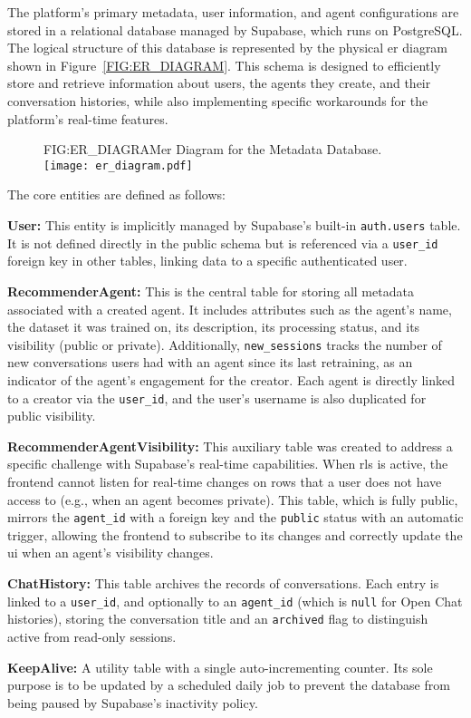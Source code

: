 The platform's primary metadata, user information, and agent configurations are stored in a relational database managed by Supabase, which runs on PostgreSQL. The logical structure of this database is represented by the physical \ac{er} diagram shown in Figure~\ref{FIG:ER_DIAGRAM}. This schema is designed to efficiently store and retrieve information about users, the agents they create, and their conversation histories, while also implementing specific workarounds for the platform's real-time features.

\begin{figure}[Entity-Relationship Diagram]{FIG:ER_DIAGRAM}{\ac{er} Diagram for the Metadata Database.}
    \texttt{[image: er\_diagram.pdf]}
\end{figure}

The core entities are defined as follows:
\begin{compactitem}[\textbullet]
    \item \textbf{User:} This entity is implicitly managed by Supabase's built-in \texttt{auth.users} table. It is not defined directly in the public schema but is referenced via a \texttt{user\_id} foreign key in other tables, linking data to a specific authenticated user.
    \item \textbf{RecommenderAgent:} This is the central table for storing all metadata associated with a created agent. It includes attributes such as the agent's name, the dataset it was trained on, its description, its processing status, and its visibility (public or private). Additionally, \texttt{new\_sessions} tracks the number of new conversations users had with an agent since its last retraining, as an indicator of the agent's engagement for the creator. Each agent is directly linked to a creator via the \texttt{user\_id}, and the user's username is also duplicated for public visibility.
    \item \textbf{RecommenderAgentVisibility:} This auxiliary table was created to address a specific challenge with Supabase's real-time capabilities. When \acl{rls} is active, the frontend cannot listen for real-time changes on rows that a user does not have access to (e.g., when an agent becomes private). This table, which is fully public, mirrors the \texttt{agent\_id} with a foreign key and the \texttt{public} status with an automatic trigger, allowing the frontend to subscribe to its changes and correctly update the \acs{ui} when an agent's visibility changes.
    \item \textbf{ChatHistory:} This table archives the records of conversations. Each entry is linked to a \texttt{user\_id}, and optionally to an \texttt{agent\_id} (which is \texttt{null} for Open Chat histories), storing the conversation title and an \texttt{archived} flag to distinguish active from read-only sessions.
    \item \textbf{KeepAlive:} A utility table with a single auto-incrementing counter. Its sole purpose is to be updated by a scheduled daily job to prevent the database from being paused by Supabase's inactivity policy.
\end{compactitem}
